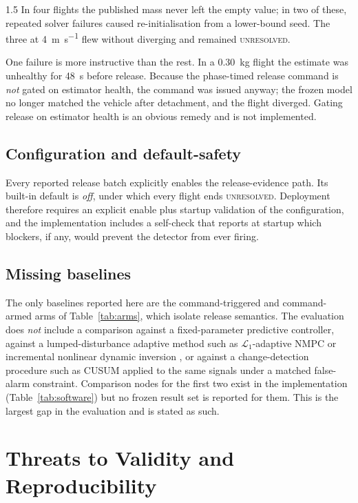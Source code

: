 \begin{spacing}{1.5}
In four flights the published mass never left the empty value; in two of these,
repeated solver failures caused re-initialisation from a lower-bound seed. The
three at \SI{4}{\meter\per\second} flew without diverging and remained
\textsc{unresolved}.

One failure is more instructive than the rest. In a \SI{0.30}{\kg} flight the
estimate was unhealthy for \SI{48}{\second} before release. Because the
phase-timed release command is \emph{not} gated on estimator health, the command
was issued anyway; the frozen model no longer matched the vehicle after
detachment, and the flight diverged. Gating release on estimator health is an
obvious remedy and is not implemented.

\subsection{Configuration and default-safety}\label{sec:eval:defaults}

Every reported release batch explicitly enables the release-evidence path. Its
built-in default is \emph{off}, under which every flight ends
\textsc{unresolved}. Deployment therefore requires an explicit enable plus
startup validation of the configuration, and the implementation includes a
self-check that reports at startup which blockers, if any, would prevent the
detector from ever firing.

\subsection{Missing baselines}\label{sec:eval:missing}

The only baselines reported here are the command-triggered and command-armed arms
of Table~\ref{tab:arms}, which isolate release semantics. The evaluation does
\emph{not} include a comparison against a fixed-parameter predictive controller,
against a lumped-disturbance adaptive method such as $\mathcal{L}_1$-adaptive
NMPC \cite{hanover2021} or incremental nonlinear dynamic inversion
\cite{smeur}, or against a change-detection procedure such as CUSUM
\cite{basseville1993} applied to the same signals under a matched false-alarm
constraint. Comparison nodes for the first two exist in the implementation
(Table~\ref{tab:software}) but no frozen result set is reported for them. This is
the largest gap in the evaluation and is stated as such.

\section{Threats to Validity and Reproducibility}\label{sec:eval:validity}


\end{spacing}
